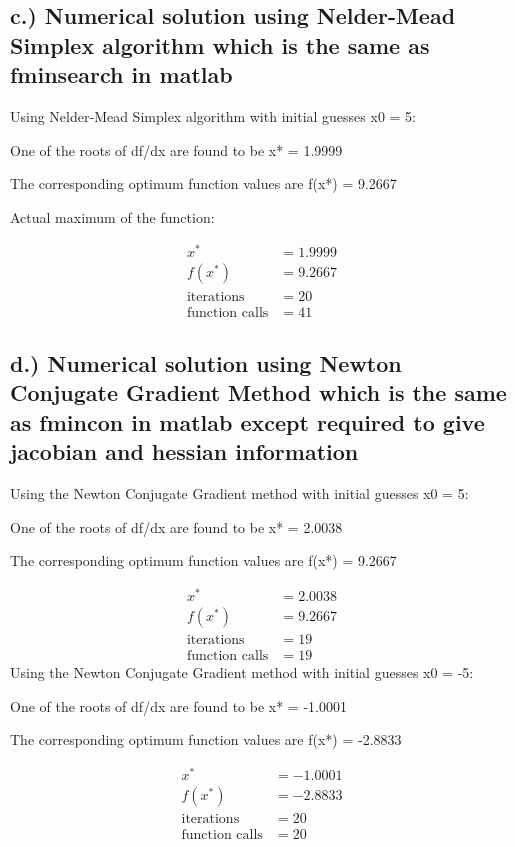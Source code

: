 \documentclass{article}%
\begin{document}
%
\subsection*{c.) Numerical solution using Nelder{-}Mead Simplex algorithm which is the same as fminsearch in matlab}%
\label{subsec:c.)NumericalsolutionusingNelder{-}MeadSimplexalgorithmwhichisthesameasfminsearchinmatlab}%
Using Nelder{-}Mead Simplex algorithm with initial guesses x0 = 5: %
\par%
One of the roots of df/dx are found to be x* = 1.9999%
\par%
The corresponding optimum function values are f(x*) = 9.2667%
\par%
Actual maximum of the function:%
\par%
\begin{align*}%
x^* &=  1.9999 \\%
f(x^*) &= 9.2667 \\%
\text{iterations} &= 20 \\%
\text{function calls} &= 41%
\end{align*}

%
\subsection*{d.) Numerical solution using Newton Conjugate Gradient Method which is the same as fmincon in matlab except required to give jacobian and hessian information}%
\label{subsec:d.)NumericalsolutionusingNewtonConjugateGradientMethodwhichisthesameasfminconinmatlabexceptrequiredtogivejacobianandhessianinformation}%
Using the Newton Conjugate Gradient method with initial guesses x0 = 5: %
\par%
One of the roots of df/dx are found to be x* = 2.0038%
\par%
The corresponding optimum function values are f(x*) = 9.2667%
\par%
\begin{align*}%
x^* &= 2.0038 \\%
f(x^*) &= 9.2667 \\%
\text{iterations} &= 19 \\%
\text{function calls} &= 19%
\end{align*}%
Using the Newton Conjugate Gradient method with initial guesses x0 = {-}5: %
\par%
One of the roots of df/dx are found to be x* = {-}1.0001%
\par%
The corresponding optimum function values are f(x*) = {-}2.8833%
\par%
\begin{align*}%
x^* &= -1.0001 \\%
f(x^*) &= -2.8833 \\%
\text{iterations} &= 20 \\%
\text{function calls} &= 20%
\end{align*}
\end{document}
